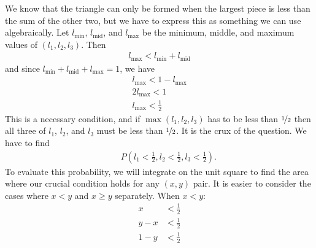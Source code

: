 \documentclass[a4paper]{article}
\begin{document}
\begin{center}
\end{center}
We know that the triangle can only be formed when the largest piece is less than the sum of the other two, but we have to express this as something we can use algebraically.
Let
$l_\text{min}$,
$l_\text{mid}$, and
$l_\text{max}$
be the minimum, middle, and maximum values of
$(l_1, l_2, l_3)$.
Then
\begin{align*}
  l_\text{max} < l_\text{min} + l_\text{mid}
\end{align*}
and since
$  l_\text{min} + l_\text{mid} + l_\text{max}  = 1 $,
we have
\begin{align*}
  l_\text{max} < 1 - l_\text{max}  \\
2 l_\text{max} < 1 \\
 l_\text{max} < \frac{1}{2}
\end{align*}
This is a necessary condition, and if
$\max(l_1, l_2, l_3)$
has to be less than
$\nicefrac{1}{2}$
then all three of
$l_1$, $l_2$, and $l_3$
must be less than $\nicefrac{1}{2}$.
It is the crux of the question.
We have to find
\begin{align*}
&\phantom{=}
P\left(
l_1 < \frac{1}{2} ,
l_2 < \frac{1}{2} ,
l_3 < \frac{1}{2}
\right)
\text{.}
\end{align*}
To evaluate this probability, we will integrate on the unit square to find the area where our crucial condition holds for any $(x,y)$ pair.
It is easier to consider the cases where $x<y$ and $x \geq y$ separately.
When $x<y$:
\begin{align*}
x     &< \frac{1}{2} \\
   y - x   &< \frac{1}{2} \\
1 -   y    &< \frac{1}{2}
\end{align*}
\end{document}
